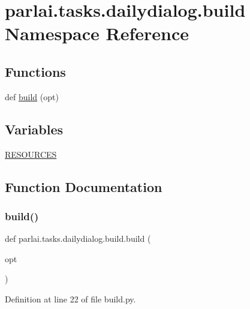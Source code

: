 \hypertarget{namespaceparlai_1_1tasks_1_1dailydialog_1_1build}{}\section{parlai.\+tasks.\+dailydialog.\+build Namespace Reference}
\label{namespaceparlai_1_1tasks_1_1dailydialog_1_1build}
\subsection*{Functions}
\begin{DoxyCompactItemize}
\item 
def \hyperlink{namespaceparlai_1_1tasks_1_1dailydialog_1_1build_a04bbf27e3a854b42e42d2b6b3c4707a0}{build} (opt)
\end{DoxyCompactItemize}
\subsection*{Variables}
\begin{DoxyCompactItemize}
\item 
\hyperlink{namespaceparlai_1_1tasks_1_1dailydialog_1_1build_a1658349174300a749db82805418b23b8}{R\+E\+S\+O\+U\+R\+C\+ES}
\end{DoxyCompactItemize}


\subsection{Function Documentation}
\mbox{\label{namespaceparlai_1_1tasks_1_1dailydialog_1_1build_a04bbf27e3a854b42e42d2b6b3c4707a0}} 
\subsubsection{\texorpdfstring{build()}{build()}}
{\footnotesize\ttfamily def parlai.\+tasks.\+dailydialog.\+build.\+build (\begin{DoxyParamCaption}\item[{}]{opt }\end{DoxyParamCaption})}



Definition at line 22 of file build.\+py.


